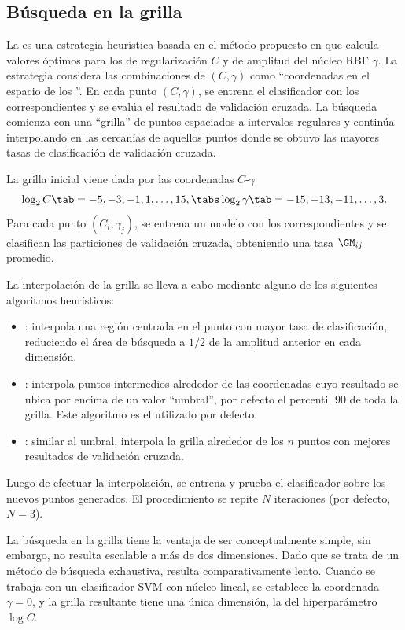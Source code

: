 %
%
\subsection{Búsqueda en la grilla}
%
La  es una estrategia heurística basada en el
método propuesto en \cite{hsu} que calcula valores óptimos para los
 de regularización $C$ y de amplitud del núcleo RBF
$\gamma$.
La estrategia considera las combinaciones de $(C,\gamma)$ como
``coordenadas en el espacio de los ''.
En cada punto $(C,\gamma)$, se entrena el clasificador con los
 correspondientes y se evalúa el resultado de validación
cruzada.
La búsqueda comienza con una ``grilla'' de puntos espaciados a
intervalos regulares y continúa interpolando en las cercanías de
aquellos puntos donde se obtuvo las mayores tasas de clasificación de
validación cruzada.

La grilla inicial viene dada por las coordenadas $C$-$\gamma$
%
\begin{align}
  \label{initial-grid}
  \log_2 C     \tab= -5, -3, -1, 1, \ldots, 15, \tabs
  \log_2\gamma \tab= -15,-13, -11, \ldots, 3.
\end{align}
%
Para cada punto $(C_i,\gamma_j)$, se entrena un modelo con los
 correspondientes y se clasifican las particiones de
validación cruzada, obteniendo una tasa $\GM_{ij}$ promedio.

La interpolación de la grilla se lleva a cabo mediante alguno de los
siguientes algoritmos heurísticos:
%
\begin{itemize}
\item
  : interpola una región centrada en el punto con mayor tasa
  de clasificación, reduciendo el área de búsqueda a $1/2$ de la
  amplitud anterior en cada dimensión.
\item
  : interpola puntos intermedios alrededor de las
  coordenadas cuyo resultado se ubica por encima de un valor
  ``umbral'', por defecto el percentil 90 de toda la grilla.
  Este algoritmo es el utilizado por defecto.
\item
  : similar al umbral, interpola la grilla alrededor de
  los $n$ puntos con mejores resultados de validación cruzada.
\end{itemize}
%
Luego de efectuar la interpolación, se entrena y prueba el
clasificador sobre los nuevos puntos generados.
El procedimiento se repite $N$ iteraciones (por defecto, $N=3$).

La búsqueda en la grilla tiene la ventaja de ser conceptualmente
simple, sin embargo, no resulta escalable a más de dos dimensiones.
Dado que se trata de un método de búsqueda exhaustiva, resulta
comparativamente lento.
Cuando se trabaja con un clasificador SVM con núcleo lineal, se
establece la coordenada $\gamma=0$, y la grilla resultante tiene una
única dimensión, la del hiperparámetro $\log C$.
